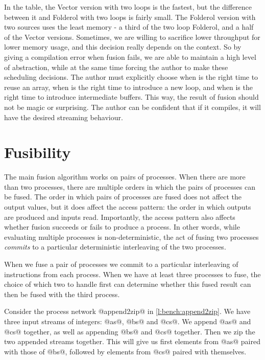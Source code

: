 In the table, the Vector version with two loops is the fastest, but the difference between it and Folderol with two loops is fairly small.
The Folderol version with two sources uses the least memory - a third of the two loop Folderol, and a half of the Vector versions.
Sometimes, we are willing to sacrifice lower throughput for lower memory usage, and this decision really depends on the context.
So by giving a compilation error when fusion fails, we are able to maintain a high level of abstraction, while at the same time forcing the author to make these scheduling decisions.
The author must explicitly choose when is the right time to reuse an array, when is the right time to introduce a new loop, and when is the right time to introduce intermediate buffers.
This way, the result of fusion should not be magic or surprising.
The author can be confident that if it compiles, it will have the desired streaming behaviour.

\section{Fusibility}
\label{s:FusionOrder}

The main fusion algorithm works on pairs of processes.
When there are more than two processes, there are multiple orders in which the pairs of processes can be fused.
The order in which pairs of processes are fused does not affect the output values, but it does affect the access pattern: the order in which outputs are produced and inputs read.
Importantly, the access pattern also affects whether fusion succeeds or fails to produce a process.
In other words, while evaluating multiple processes is non-deterministic, the act of fusing two processes \emph{commits} to a particular deterministic interleaving of the two processes.

When we fuse a pair of processes we commit to a particular interleaving of instructions from each process.
When we have at least three processes to fuse, the choice of which two to handle first can determine whether this fused result can then be fused with the third process.

Consider the process network @append2zip@ in \autoref{l:bench:append2zip}.
We have three input streams of integers: @as@, @bs@ and @cs@.
We append @as@ and @cs@ together, as well as appending @bs@ and @cs@ together.
Then we zip the two appended streams together.
This will give us first elements from @as@ paired with those of @bs@, followed by elements from @cs@ paired with themselves.

